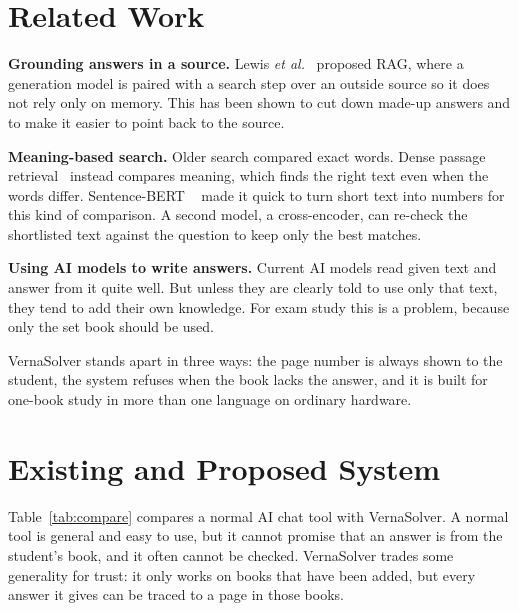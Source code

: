 \documentclass[journal]{IEEEtran}
\begin{document}
\section{Related Work}
\textbf{Grounding answers in a source.} Lewis \textit{et
al.}~\cite{lewis2020rag} proposed RAG, where a generation model is paired
with a search step over an outside source so it does not rely only on
memory. This has been shown to cut down made-up answers and to make it
easier to point back to the source.

\textbf{Meaning-based search.} Older search compared exact words. Dense
passage retrieval~\cite{karpukhin2020dpr} instead compares meaning, which
finds the right text even when the words differ. Sentence-BERT
~\cite{reimers2019sbert} made it quick to turn short text into numbers for
this kind of comparison. A second model, a cross-encoder, can re-check
the shortlisted text against the question to keep only the best matches.

\textbf{Using AI models to write answers.} Current AI models read given
text and answer from it quite well. But unless they are clearly told to
use only that text, they tend to add their own knowledge. For exam study
this is a problem, because only the set book should be used.

VernaSolver stands apart in three ways: the page number is always shown
to the student, the system refuses when the book lacks the answer, and it
is built for one-book study in more than one language on ordinary
hardware.

\section{Existing and Proposed System}
Table~\ref{tab:compare} compares a normal AI chat tool with VernaSolver.
A normal tool is general and easy to use, but it cannot promise that an
answer is from the student's book, and it often cannot be checked.
VernaSolver trades some generality for trust: it only works on books that
have been added, but every answer it gives can be traced to a page in
those books.
\end{document}

